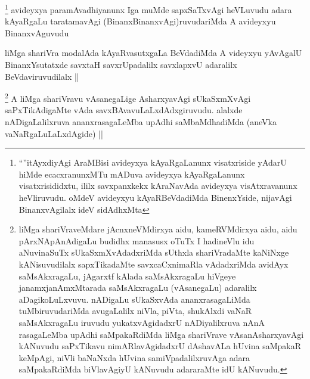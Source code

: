 
\begin{artha}
\footnote{``\stext''itAyxdiyAgi AraMBisi avideyxya kAyaRgaLanunx visatxriside yAdarU hiMde ecacxranunxMTu mADuva avideyxya kAyaRgaLanunx visatxrisididxtu, ililx savxpanxkekx kAraNavAda avideyxya visAtxravanunx heVliruvudu. oMdeV avideyxyu kAyaRBeVdadiMda BinenxYside, nijavAgi BinanxvAgilalx ideV sidAdhxMta}
avideyxya paramAvadhiyanunx Iga muMde sapxSaTxvAgi heVLuvudu adara kAyaRgaLu taratamavAgi (BinanxBinanxvAgi)ruvudariMda A avideyxyu BinanxvAguvudu
\end{artha}


\begin{artha}
liMga shariVra modalAda kAyaRvasutxgaLa BeVdadiMda A videyxyu yAvAgalU BinanxYsutatxde savxtaH savxrUpadalilx savxlapxvU adaralilx BeVdaviruvudilalx ||
\end{artha}


\begin{artha}
\footnote{liMga shariVraveMdare jAcnxneVMdirxya aidu, kameRVMdirxya aidu, aidu pArxNApAnAdigaLu budidhx manasusx oTuTx I hadineVlu idu aNuvinaSuTx sUkaSxmXvAdadxriMda sUthxla shariVradaMte kaNiNxge kANisuvudilalx sapxTikadaMte savxcaCxnimaRla vAdadxriMda avidAyx saMsAkxragaLu, jAgarxtf kAlada saMsAkxragaLu hiVgeye janamxjanAmxMtarada saMsAkxragaLu (vAsanegaLu) adaralilx aDagikoLuLxvuvu. nADigaLu sUkaSxvAda ananxrasagaLiMda tuMbiruvudariMda avugaLalilx niVla, piVta, shukAlxdi vaNaR saMsAkxragaLu iruvudu yukatxvAgidadxrU nADiyalilxruva nAnA rasagaLeMba upAdhi saMpakaRdiMda liMga shariVrave vAsanAsharxyavAgi kANuvudu saPxTikavu nimARlavAgidadxrU dAshavALa hUvina saMpakaR keMpAgi, niVli baNaNxda hUvina samiVpadalilxruvAga adara saMpakaRdiMda biVlavAgiyU kANuvudu adararaMte idU kANuvudu.}
A liMga shariVravu vAsanegaLige AsharxyavAgi sUkaSxmXvAgi saPxTikAdigaMte vAda savxBAvavuLaLxdAdxgiruvudu. alalxde nADigaLalilxruva ananxrasagaLeMba upAdhi saMbaMdhadiMda (aneVka vaNaRgaLuLaLxdAgide) ||
\end{artha}


